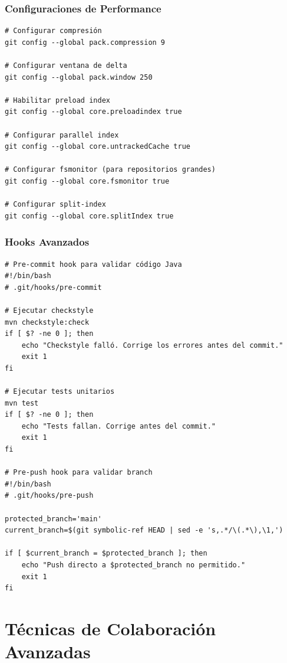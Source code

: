 \documentclass[12pt,a4paper]{article}
\begin{document}
\subsubsection{Configuraciones de Performance}
\begin{lstlisting}[caption=Optimizaciones de rendimiento]
# Configurar compresión
git config --global pack.compression 9

# Configurar ventana de delta
git config --global pack.window 250

# Habilitar preload index
git config --global core.preloadindex true

# Configurar parallel index
git config --global core.untrackedCache true

# Configurar fsmonitor (para repositorios grandes)
git config --global core.fsmonitor true

# Configurar split-index
git config --global core.splitIndex true
\end{lstlisting}

\subsubsection{Hooks Avanzados}
\begin{lstlisting}[caption=Scripts de automatización con hooks]
# Pre-commit hook para validar código Java
#!/bin/bash
# .git/hooks/pre-commit

# Ejecutar checkstyle
mvn checkstyle:check
if [ $? -ne 0 ]; then
    echo "Checkstyle falló. Corrige los errores antes del commit."
    exit 1
fi

# Ejecutar tests unitarios
mvn test
if [ $? -ne 0 ]; then
    echo "Tests fallan. Corrige antes del commit."
    exit 1
fi

# Pre-push hook para validar branch
#!/bin/bash
# .git/hooks/pre-push

protected_branch='main'
current_branch=$(git symbolic-ref HEAD | sed -e 's,.*/\(.*\),\1,')

if [ $current_branch = $protected_branch ]; then
    echo "Push directo a $protected_branch no permitido."
    exit 1
fi
\end{lstlisting}

\section{Técnicas de Colaboración Avanzadas}
\end{document}
